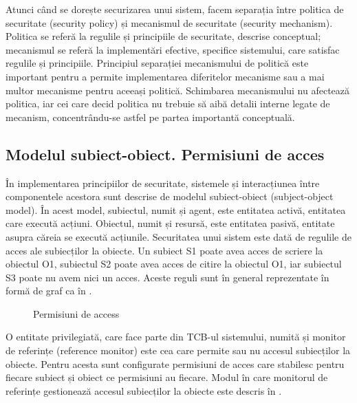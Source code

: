 Atunci când se dorește securizarea unui sistem, facem separația între politica de securitate (security policy) și mecanismul de securitate (security mechanism). Politica se referă la regulile și principiile de securitate, descrise conceptual; mecanismul se referă la implementări efective, specifice sistemului, care satisfac regulile și principiile. Principiul separației mecanismului de politică este important pentru a permite implementarea diferitelor mecanisme sau a mai multor mecanisme pentru aceeași politică. Schimbarea mecanismului nu afectează politica, iar cei care decid politica nu trebuie să aibă detalii interne legate de mecanism, concentrându-se astfel pe partea importantă conceptuală.

\subsection{Modelul subiect-obiect. Permisiuni de acces}
\label{sec:sec:permissions}

În implementarea principiilor de securitate, sistemele și interacțiunea între componentele acestora sunt descrise de modelul subiect-obiect (subject-object model). În acest model, subiectul, numit și agent, este entitatea activă, entitatea care execută acțiuni. Obiectul, numit și resursă, este entitatea pasivă, entitate asupra căreia se execută acțiunile. Securitatea unui sistem este dată de regulile de acces ale subiecților la obiecte. Un subiect S1 poate avea acces de scriere la obiectul O1, subiectul S2 poate avea acces de citire la obiectul O1, iar subiectul S3 poate nu avem nici un acces. Aceste reguli sunt în general reprezentate în formă de graf ca în .

\begin{figure}[htbp]
  \centering
  \def\svgwidth{\columnwidth}
  
  \caption{Permisiuni de access}
  \label{fig:sec:access-permissions}
\end{figure}

O entitate privilegiată, care face parte din TCB-ul sistemului, numită și monitor de referințe (reference monitor) este cea care permite sau nu accesul subiecților la obiecte. Pentru acesta sunt configurate permisiuni de acces care stabilesc pentru fiecare subiect și obiect ce permisiuni au fiecare. Modul în care monitorul de referințe gestionează accesul subiecților la obiecte este descris în .


